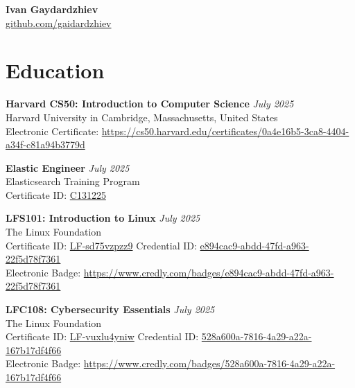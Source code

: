 \documentclass[a4paper,10pt]{article}
\newcommand{\contactinfo}[3]{\faIcon{#1} \href{#2}{#3}}
\begin{document}
\begin{center}
    {\LARGE \textbf{Ivan Gaydardzhiev}}\\[6pt]
    \contactinfo{github}{https://github.com/gaidardzhiev}{github.com/gaidardzhiev} \quad
\end{center}


\section*{Education}
\noindent
\textbf{Harvard CS50: Introduction to Computer Science} \hfill \textit{July 2025} \\
Harvard University in Cambridge, Massachusetts, United States \\
Electronic Certificate:  \url{https://cs50.harvard.edu/certificates/0a4e16b5-3ca8-4404-a34f-c81a94b3779d}
\noindent

\textbf{Elastic Engineer} \hfill \textit{July 2025} \\
Elasticsearch Training Program\\
Certificate ID:  \url{C131225}
\noindent

\textbf{LFS101: Introduction to Linux} \hfill \textit{July 2025} \\
The Linux Foundation\\
Certificate ID:  \url{LF-sd75vzpzz9} \hfill Credential ID:  \url{e894cac9-abdd-47fd-a963-22f5d78f7361}\\
Electronic Badge:  \url{https://www.credly.com/badges/e894cac9-abdd-47fd-a963-22f5d78f7361}
\noindent

\textbf{LFC108: Cybersecurity Essentials} \hfill \textit{July 2025} \\
The Linux Foundation\\
Certificate ID:  \url{LF-vuxlu4yniw} \hfill Credential ID:  \url{528a600a-7816-4a29-a22a-167b17df4f66}\\
Electronic Badge:  \url{https://www.credly.com/badges/528a600a-7816-4a29-a22a-167b17df4f66}
\noindent
\end{document}
